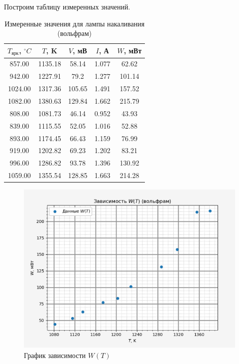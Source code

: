 \documentclass[a4paper, 12pt]{article}%
\begin{document}
    Построим таблицу измеренных значений.

    \begin{table}[h!]
        \centering
        \begin{tabular}{|c|c|c|c|c|}
        \hline
        $T_{\text{ярк}}$, $^\circ C$ & $T$, K  & $V$, мВ & $I$, А & $W$, мВт \\ \hline
        857.00              & 1135.18 & 58.14   & 1.077  & 62.62  \\ \hline
        942.00              & 1227.91 & 79.2    & 1.277  & 101.14 \\ \hline
        1024.00             & 1317.36 & 105.65  & 1.491  & 157.52 \\ \hline
        1082.00             & 1380.63 & 129.84  & 1.662  & 215.79 \\ \hline
        808.00              & 1081.73 & 46.14   & 0.952  & 43.93  \\ \hline
        839.00              & 1115.55 & 52.05   & 1.016  & 52.88  \\ \hline
        893.00              & 1174.45 & 66.43   & 1.159  & 76.99  \\ \hline
        919.00              & 1202.82 & 69.23   & 1.202  & 83.21  \\ \hline
        996.00              & 1286.82 & 93.78   & 1.396  & 130.92 \\ \hline
        1059.00             & 1355.54 & 128.85  & 1.663  & 214.28 \\ \hline
        \end{tabular}
        \caption{Измеренные значения для лампы накаливания (вольфрам)}
    \end{table}
    
    \begin{figure}[h!]
        \centering
        \includegraphics[width = 13 cm]{WT.png}
        \caption{График зависимости $W(T)$}
        \label{}
    \end{figure}
\end{document}
